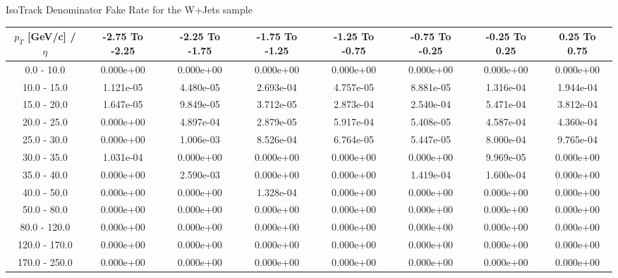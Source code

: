 \large 
IsoTrack Denominator Fake Rate for the W+Jets sample
\footnotesize 
\begin{tabular*}{\textwidth}{|c|c|c|c|c|c|c|c|}\hline 
$p_T$ [GeV/c] / $\eta$  & -2.75 To -2.25 & -2.25 To -1.75 & -1.75 To -1.25 & -1.25 To -0.75 & -0.75 To -0.25 & -0.25 To 0.25 & 0.25 To 0.75 \\ 
 \hline 
0.0 - 10.0 & 0.000e+00 & 0.000e+00 & 0.000e+00 & 0.000e+00 & 0.000e+00 & 0.000e+00 & 0.000e+00 \\ 
10.0 - 15.0 & 1.121e-05 & 4.480e-05 & 2.693e-04 & 4.757e-05 & 8.881e-05 & 1.316e-04 & 1.944e-04 \\ 
15.0 - 20.0 & 1.647e-05 & 9.849e-05 & 3.712e-05 & 2.873e-04 & 2.540e-04 & 5.471e-04 & 3.812e-04 \\ 
20.0 - 25.0 & 0.000e+00 & 4.897e-04 & 2.879e-05 & 5.917e-04 & 5.408e-05 & 4.587e-04 & 4.360e-04 \\ 
25.0 - 30.0 & 0.000e+00 & 1.006e-03 & 8.526e-04 & 6.764e-05 & 5.447e-05 & 8.000e-04 & 9.765e-04 \\ 
30.0 - 35.0 & 1.031e-04 & 0.000e+00 & 0.000e+00 & 0.000e+00 & 0.000e+00 & 9.969e-05 & 0.000e+00 \\ 
35.0 - 40.0 & 0.000e+00 & 2.590e-03 & 0.000e+00 & 0.000e+00 & 1.419e-04 & 1.600e-04 & 0.000e+00 \\ 
40.0 - 50.0 & 0.000e+00 & 0.000e+00 & 1.328e-04 & 0.000e+00 & 0.000e+00 & 0.000e+00 & 0.000e+00 \\ 
50.0 - 80.0 & 0.000e+00 & 0.000e+00 & 0.000e+00 & 0.000e+00 & 0.000e+00 & 0.000e+00 & 0.000e+00 \\ 
80.0 - 120.0 & 0.000e+00 & 0.000e+00 & 0.000e+00 & 0.000e+00 & 0.000e+00 & 0.000e+00 & 0.000e+00 \\ 
120.0 - 170.0 & 0.000e+00 & 0.000e+00 & 0.000e+00 & 0.000e+00 & 0.000e+00 & 0.000e+00 & 0.000e+00 \\ 
170.0 - 250.0 & 0.000e+00 & 0.000e+00 & 0.000e+00 & 0.000e+00 & 0.000e+00 & 0.000e+00 & 0.000e+00 \\ 
 \hline 
\end{tabular*} 
